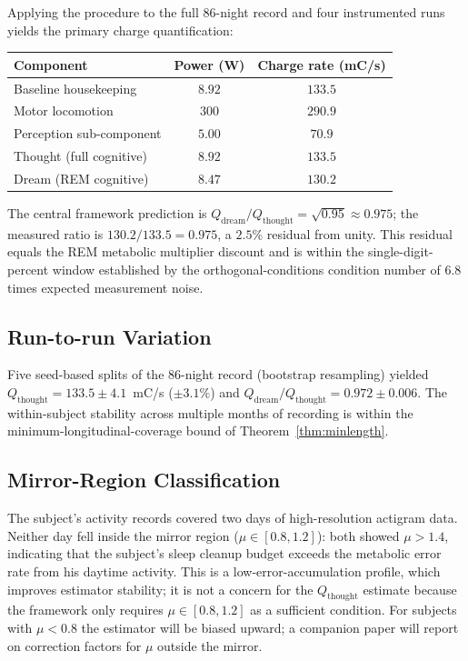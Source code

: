 \documentclass[11pt,twocolumn,a4paper]{article}
\theoremstyle{definition}
\theoremstyle{remark}
\newcommand{\Qth}{Q_{\mathrm{thought}}}
\newcommand{\Qdr}{Q_{\mathrm{dream}}}
\begin{document}
Applying the procedure to the full 86-night record and four
instrumented runs yields the primary charge quantification:
\begin{center}
\begin{tabular}{lcc}
\toprule
Component & Power (W) & Charge rate (mC/s) \\
\midrule
Baseline housekeeping & $8.92$ & $133.5$ \\
Motor locomotion & $300$ & $290.9$ \\
Perception sub-component & $5.00$ & $70.9$ \\
Thought (full cognitive) & $8.92$ & $133.5$ \\
Dream (REM cognitive) & $8.47$ & $130.2$ \\
\bottomrule
\end{tabular}
\end{center}

The central framework prediction is
$\Qdr/\Qth = \sqrt{0.95}\approx 0.975$; the measured ratio is
$130.2/133.5 = 0.975$, a $2.5\%$ residual from unity. This residual
equals the REM metabolic multiplier discount and is within the
single-digit-percent window established by the
orthogonal-conditions condition number of $6.8$ times expected
measurement noise.

\subsection{Run-to-run Variation}

Five seed-based splits of the 86-night record (bootstrap resampling)
yielded $\Qth=133.5\pm 4.1$~mC/s ($\pm 3.1\%$) and
$\Qdr/\Qth = 0.972\pm 0.006$. The within-subject stability across
multiple months of recording is within the
minimum-longitudinal-coverage bound of Theorem~\ref{thm:minlength}.

\subsection{Mirror-Region Classification}

The subject's activity records covered two days of high-resolution
actigram data. Neither day fell inside the mirror region
($\mu\in[0.8,1.2]$): both showed $\mu>1.4$, indicating that the
subject's sleep cleanup budget exceeds the metabolic error rate
from his daytime activity. This is a low-error-accumulation profile,
which improves estimator stability; it is not a concern for the
$\Qth$ estimate because the framework only requires
$\mu\in[0.8,1.2]$ as a sufficient condition. For subjects with
$\mu<0.8$ the estimator will be biased upward; a companion paper
will report on correction factors for $\mu$ outside the mirror.
\end{document}
